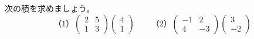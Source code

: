 \begin{jibun}
次の積を求めましょう。
\[ \text{（1）}\begin{pmatrix} 2 & 5\\ 1 & 3 \end{pmatrix}\begin{pmatrix} 4\\ 1 \end{pmatrix}\qquad \text{（2）}\begin{pmatrix} -1 & 2\\ 4 & -3 \end{pmatrix}\begin{pmatrix} 3\\ -2 \end{pmatrix} \]
\end{jibun}

